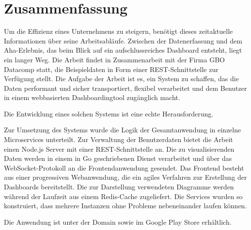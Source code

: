 \chapter*{Zusammenfassung}
\label{chap:zusammenfassung}

Um die Effizienz eines Unternehmens zu steigern, benötigt dieses zeitaktuelle Informationen über seine Arbeitsabläufe.
Zwischen der Datenerfassung und dem Aha-Erlebnis, das beim Blick auf ein aufschlussreiches Dashboard entsteht, liegt ein
langer Weg. Die Arbeit findet in Zusammenarbeit mit der Firma GBO Datacomp statt, die Beispieldaten
in Form einer REST-Schnittstelle zur Verfügung stellt. Die Aufgabe der Arbeit ist es, ein System zu schaffen,
das die Daten performant und sicher transportiert, flexibel verarbeitet und dem Benutzer
in einem webbasierten Dashboardingtool zugänglich macht.

Die Entwicklung eines solchen Systems ist eine echte Herausforderung.

Zur Umsetzung des Systems wurde die Logik der Gesamtanwendung in einzelne Microservices
unterteilt. Zur Verwaltung der Benutzerdaten bietet die Arbeit einen Node.js Server
mit einer REST-Schnittstelle an. Die zu visualisierenden Daten werden in einem
in Go geschriebenen Dienst verarbeitet und über das WebSocket-Protokoll an die
Frontendanwendung gesendet. Das Frontend besteht aus einer progressiven Webanwendung,
die ein agiles Verfahren zur Erstellung der Dashboards bereitstellt. Die zur Darstellung
verwendeten Diagramme werden während der Laufzeit aus einem Redis-Cache zugeliefert.
Die Services wurden so konstruiert, dass mehrere Instanzen ohne Probleme nebeneinander
laufen können.

Die Anwendung ist unter der Domain  sowie im Google Play Store erhältlich.


